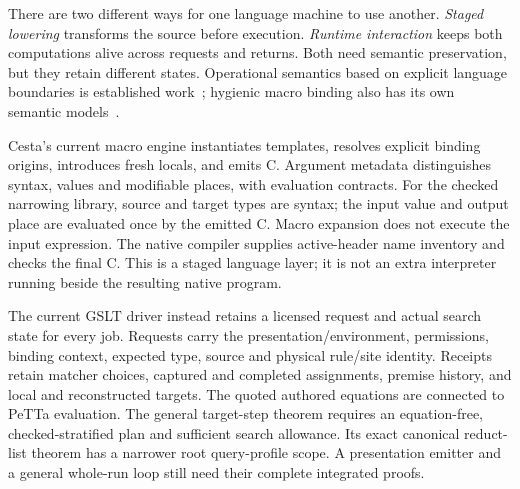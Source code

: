 \documentclass[11pt,a4paper]{article}
\begin{document}
There are two different ways for one language machine to use another.
\emph{Staged lowering} transforms the source before execution.
\emph{Runtime interaction} keeps both computations alive across requests and
returns. Both need semantic preservation, but they retain different states.
Operational semantics based on explicit language boundaries is established
work~\cite{MultiLanguage}; hygienic macro binding also has its own semantic
models~\cite{ScopeSets}.

\begin{center}
\end{center}

Cesta's current macro engine instantiates templates, resolves explicit binding
origins, introduces fresh locals, and emits C. Argument metadata distinguishes
syntax, values and modifiable places, with evaluation contracts. For the
checked narrowing library, source and target types are syntax; the input value
and output place are evaluated once by the emitted C. Macro expansion does not
execute the input expression. The native compiler supplies active-header name
inventory and checks the final C. This is a staged language layer; it is not an
extra interpreter running beside the resulting native program.

The current GSLT driver instead retains a licensed request and actual search
state for every job. Requests carry the presentation/environment, permissions,
binding context, expected type, source and physical rule/site identity.
Receipts retain matcher choices, captured and completed assignments, premise
history, and local and reconstructed targets. The quoted authored equations
are connected to PeTTa evaluation. The general target-step theorem requires
an equation-free, checked-stratified plan and sufficient search allowance.
Its exact canonical reduct-list theorem has a narrower root query-profile
scope. A presentation emitter and a general whole-run loop still need their
complete integrated proofs.
\end{document}
